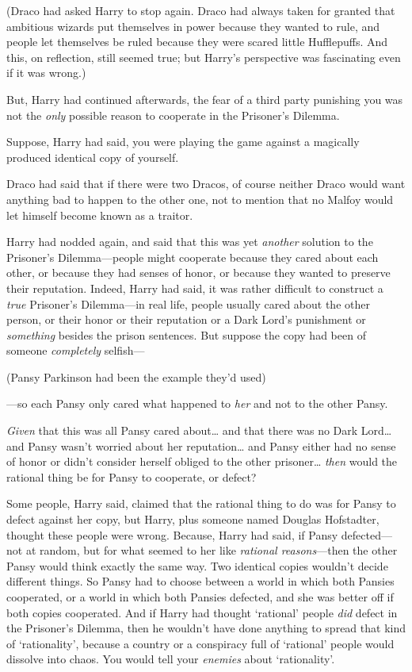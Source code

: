 (Draco had asked Harry to stop again. Draco had always taken for granted that ambitious wizards put themselves in power because they wanted to rule, and people let themselves be ruled because they were scared little Hufflepuffs. And this, on reflection, still seemed true; but Harry's perspective was fascinating even if it was wrong.)

But, Harry had continued afterwards, the fear of a third party punishing you was not the \emph{only} possible reason to cooperate in the Prisoner's Dilemma.

Suppose, Harry had said, you were playing the game against a magically produced identical copy of yourself.

Draco had said that if there were two Dracos, of course neither Draco would want anything bad to happen to the other one, not to mention that no Malfoy would let himself become known as a traitor.

Harry had nodded again, and said that this was yet \emph{another} solution to the Prisoner's Dilemma—people might cooperate because they cared about each other, or because they had senses of honor, or because they wanted to preserve their reputation. Indeed, Harry had said, it was rather difficult to construct a \emph{true} Prisoner's Dilemma—in real life, people usually cared about the other person, or their honor or their reputation or a Dark Lord's punishment or \emph{something} besides the prison sentences. But suppose the copy had been of someone \emph{completely} selfish—

(Pansy Parkinson had been the example they'd used)

—so each Pansy only cared what happened to \emph{her} and not to the other Pansy.

\emph{Given} that this was all Pansy cared about{\ldots} and that there was no Dark Lord{\ldots} and Pansy wasn't worried about her reputation{\ldots} and Pansy either had no sense of honor or didn't consider herself obliged to the other prisoner{\ldots} \emph{then} would the rational thing be for Pansy to cooperate, or defect?

Some people, Harry said, claimed that the rational thing to do was for Pansy to defect against her copy, but Harry, plus someone named Douglas Hofstadter, thought these people were wrong. Because, Harry had said, if Pansy defected—not at random, but for what seemed to her like \emph{rational reasons}—then the other Pansy would think exactly the same way. Two identical copies wouldn't decide different things. So Pansy had to choose between a world in which both Pansies cooperated, or a world in which both Pansies defected, and she was better off if both copies cooperated. And if Harry had thought `rational' people \emph{did} defect in the Prisoner's Dilemma, then he wouldn't have done anything to spread that kind of `rationality', because a country or a conspiracy full of `rational' people would dissolve into chaos. You would tell your \emph{enemies} about `rationality'.

